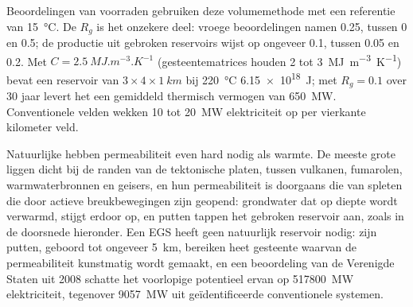Beoordelingen van voorraden gebruiken deze volumemethode met een referentie van \qty{15}{\celsius}. De
 $R_g$ is het onzekere deel: vroege beoordelingen namen 0.25, tussen 0 en 0.5; de productie uit
gebroken reservoirs wijst op ongeveer 0.1, tussen 0.05 en 0.2. Met $C = \qty{2.5}{MJ.m^{-3}.K^{-1}}$
(gesteentematrices houden 2 tot \qty{3}{MJ.m^{-3}.K^{-1}}) bevat een reservoir van $3 \times 4 \times
\qty{1}{km}$ bij \qty{220}{\celsius} \qty{6.15e18}{J}; met $R_g = 0.1$ over 30 jaar levert het
een gemiddeld thermisch vermogen van \qty{650}{MW}. Conventionele velden wekken 10 tot
\qty{20}{MW} elektriciteit op per vierkante kilometer veld.

Natuurlijke  hebben permeabiliteit even hard nodig als warmte. De meeste grote liggen dicht bij de
randen van de tektonische platen, tussen vulkanen, fumarolen, warmwaterbronnen en geisers, en hun
permeabiliteit is doorgaans die van spleten die door actieve breukbewegingen zijn geopend: grondwater dat op diepte wordt verwarmd,
stijgt erdoor op, en putten tappen het gebroken reservoir aan, zoals in de doorsnede hieronder. Een EGS heeft geen natuurlijk reservoir nodig:
zijn putten, geboord tot ongeveer \qty{5}{km}, bereiken heet gesteente waarvan de permeabiliteit kunstmatig wordt gemaakt, en
een beoordeling van de Verenigde Staten uit 2008 schatte het voorlopige potentieel ervan op \qty{517800}{MW}
elektriciteit, tegenover \qty{9057}{MW} uit geïdentificeerde conventionele systemen.


